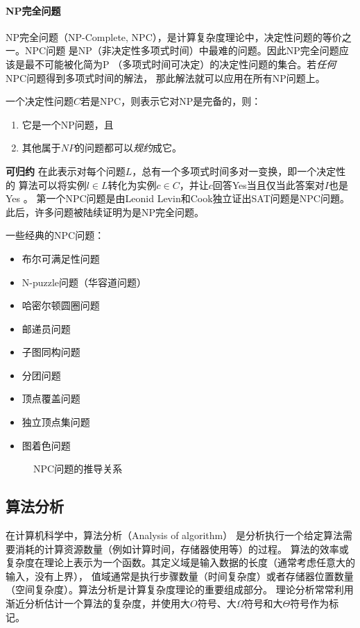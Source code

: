 \paragraph{NP完全问题}
NP完全问题（NP-Complete, NPC），是计算复杂度理论中，决定性问题的等价之一。NPC问题
是NP（非决定性多项式时间）中最难的问题。因此NP完全问题应该是最不可能被化简为P
（多项式时间可决定）的决定性问题的集合。若\emph{任何}NPC问题得到多项式时间的解法，
那此解法就可以应用在所有NP问题上。

一个决定性问题$C$若是NPC，则表示它对NP是完备的，则：
\begin{enumerate}
  \item 它是一个NP问题，且
  \item 其他属于$NP$的问题都可以\emph{规约}成它。
\end{enumerate}
\textbf{可归约} 在此表示对每个问题$L$，总有一个多项式时间多对一变换，即一个决定性的
算法可以将实例$ l \in L $转化为实例$ c \in C $，并让$c$回答Yes当且仅当此答案对$I$也是
Yes \cite{DBLP:journals/jacm/Ladner75}。
第一个NPC问题是由Leonid Levin和Cook独立证出SAT问题是NPC问題\cite{DBLP:conf/stoc/Cook71}。
此后，许多问题被陆续证明为是NP完全问题。

一些经典的NPC问题：
\begin{itemize}
  \item 布尔可满足性问题
  \item N-puzzle问题（华容道问题）
  \item 哈密尔顿圆圈问题
  \item 邮递员问题
  \item 子图同构问题
  \item 分团问题
  \item 顶点覆盖问题
  \item 独立顶点集问题
  \item 图着色问题
\end{itemize}

\begin{figure}[H]
  \caption{NPC问题的推导关系}
  \centering
  
\end{figure}

\subsection{算法分析}
在计算机科学中，算法分析（Analysis of algorithm）
是分析执行一个给定算法需要消耗的计算资源数量（例如计算时间，存储器使用等）的过程\cite{DBLP:books/daglib/0023376}。
算法的效率或复杂度在理论上表示为一个函数。其定义域是输入数据的长度（通常考虑任意大的输入，没有上界），
值域通常是执行步骤数量（时间复杂度）或者存储器位置数量（空间复杂度）。算法分析是计算复杂度理论的重要组成部分。
理论分析常常利用渐近分析估计一个算法的复杂度，并使用大$O$符号、大$\Omega$符号和大$\Theta$符号作为标记。

